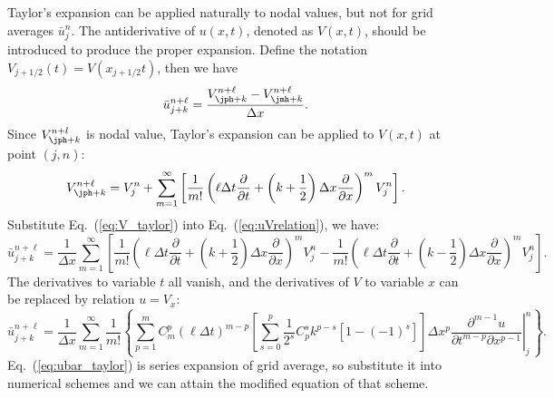 \documentclass[]{article}
\begin{document}
Taylor's expansion can be applied naturally to nodal values, but not for
grid averages $\bar u_j^n$. The antiderivative of $u(x,t)$, 
denoted as $V(x,t)$,
should be introduced to produce the proper expansion. Define the notation
$V_{j+1/2}(t)=V(x_{j+1/2}t)$, then we have
\begin{equation}
    \bar u_{j+k}^{n+\ell}=
    \frac{V_{\jph+k}^{n+\ell}-V_{\jmh+k}^{n+\ell}}{\Delta x}.
    \label{eq:uVrelation}
\end{equation}
Since $V_{\jph+k}^{n+l}$ is nodal value, Taylor's expansion can be
applied to $V(x,t)$ at point $(j,n)$:
\begin{equation}
    V_{\jph+k}^{n+\ell} = V_{j}^n + \sum_{m=1}^{\infty}
    \left[ 
	\frac{1}{m!} 
	\left(
	\ell\Delta t \frac{\partial}{\partial t} + 
	\left(k+\frac{1}{2}\right) \Delta x\frac{\partial}{\partial x}
	\right)^m V_j^n
    \right].
    \label{eq:V_taylor}
\end{equation}
Substitute Eq.~(\ref{eq:V_taylor}) into Eq.~(\ref{eq:uVrelation}), we
have:
\begin{equation}
    \bar u_{j+k}^{n+\ell} = \frac{1}{\Delta x} \sum_{m=1}^{\infty} 
    \left[
	\frac{1}{m!}\left( \ell\Delta t\frac{\partial}{\partial t} +
	\left(k+\frac{1}{2}\right)\Delta x\frac{\partial}{\partial x}\right)^m 
	V_j^n -
	\frac{1}{m!}\left(\ell\Delta t\frac{\partial}{\partial t} +
	\left(k-\frac{1}{2}\right)\Delta x\frac{\partial}{\partial x}\right)^m 
	V_j^n
    \right].
    \label{eq:uVrelation2}
\end{equation}
The derivatives to variable $t$ all vanish, and the derivatives of $V$ to
variable $x$ can be replaced by relation $u=V_x$:
\begin{equation}
    \bar u_{j+k}^{n+\ell} = \frac{1}{\Delta x} \sum_{m=1}^{\infty}\frac{1}{m!}
    \left\{
	\sum_{p=1}^m C_m^p(\ell\Delta t)^{m-p} 
	\left[
	    \sum_{s=0}^p \frac{1}{2^s}C_p^s k^{p-s}\left[1-(-1)^s\right]
	\right]
	\Delta x^p 
	\left. 
	\frac{\partial ^{m-1}u}{\partial t^{m-p}\partial x^{p-1}}
	\right|_j^n
    \right\}.
    \label{eq:ubar_taylor}
\end{equation}
Eq.~(\ref{eq:ubar_taylor}) is series expansion of
grid average, so substitute it into numerical schemes and we can
attain the modified equation of that scheme.
\end{document}
